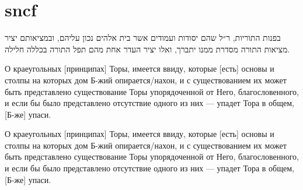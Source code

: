\documentclass{book}
\begin{document}
\numberlinefalse
\numberpstarttrue 
\sidepstartnumtrue 
\chapter{sncf}
\beforeeledchapter


\begin{pages}

\begin{Rightside} %
\begin{RTL}%
\begin{hebrew}%
\beginnumbering%
\pstart
{}
\pend
\pstart
{}
\pend
\pstart
בפנות התוריות, ר״ל שהם יסודות ועמודים אשר בית אלהים נכון עליהם, ובמציאותם יציר מציאות התורה מסדרת ממנו     יתברך, ואלו יציר העדר אחת מהם תפל התורה בכללה חלילה.
\pend    
\endnumbering%
\end{hebrew}%
\end{RTL}%
\end{Rightside}%



\begin{russian}%
\begin{Leftside} %
\beginnumbering%
\pstart
{}   
\pend 
\pstart
{}   
\pend 
\pstart
О краеугольных [принципах] Торы, имеется ввиду, которые [есть] основы и столпы на которых дом Б-жий опирается/нахон, и с существованием их может быть представлено существование Торы упорядоченной от Него, благословенного, и если бы было представлено отсутствие одного из них — упадет Тора в общем, [Б-же] упаси.
\pend
\endnumbering%
\end{Leftside}%
\end{russian}%



\Pages
\end{pages}

\beginnumbering%
\pstart
{}   
\pend 
\pstart
{}   
\pend 
\pstart
О краеугольных [принципах] Торы, имеется ввиду, которые [есть] основы и столпы на которых дом Б-жий опирается/нахон, и с существованием их может быть представлено существование Торы упорядоченной от Него, благословенного, и если бы было представлено отсутствие одного из них — упадет Тора в общем, [Б-же] упаси.
\pend
\endnumbering%
\end{document}
